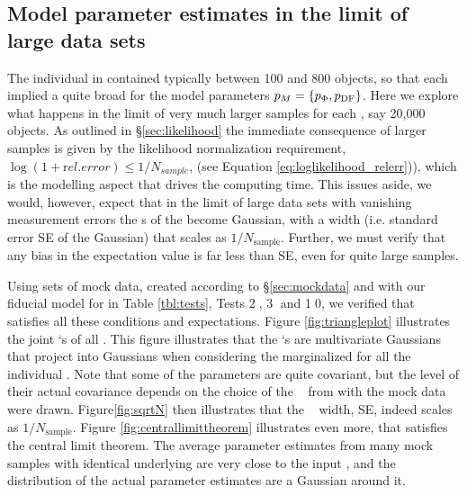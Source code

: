 \subsection{Model parameter estimates in the limit of large data sets} \label{sec:largedata}

The individual \MAP in \citet{bov13} contained typically between 100 and 800 objects, so that each \MAP implied a quite broad \pdf for the model parameters $p_M=\{p_\Phi,p_\text{DF}\}$. Here we explore what happens in the limit of very much larger samples for each \MAP, say 20,000 objects. As outlined in \S\ref{sec:likelihood} the immediate consequence of larger samples is given by the likelihood normalization requirement, $\log(1+{\mathrm rel. error})\le 1/N_{sample}$, (see Equation \ref{eq:loglikelihood_relerr})), which is the modelling aspect that drives the computing time. This issues aside, we would, however, expect that in the limit of large data sets with vanishing measurement errors the \pdf s of the \pmodel become Gaussian, with a \pdf width (i.e. standard error SE of the Gaussian) that scales as $1/N_\text{sample}$. Further, we must verify that any bias in the \pdf expectation value is far less than SE, even for quite large samples.

Using sets of mock data, created according to \S\ref{sec:mockdata} and with our fiducial model for \pmodel in Table \ref{tbl:tests}, Tests \textcircled{2}, \textcircled{3} and \textcircled{10}, we verified that \RM satisfies all these conditions and expectations. Figure \ref{fig:triangleplot} illustrates the joint \pdf `s of all \pmodel. This figure illustrates that the \pdf `s are multivariate Gaussians that project into Gaussians when considering the marginalized \pdf for all the individual \pmodel . Note that some of the parameters are quite covariant, but the level of their actual covariance depends on the choice of the \pmodel~ from with the mock data were drawn.  Figure\ref{fig:sqrtN} then illustrates that the \pdf~ width, SE, indeed scales as $1/N_\text{sample}$. Figure \ref{fig:centrallimittheorem} illustrates even more, that \RM satisfies the central limit theorem. The average parameter estimates from many mock samples with identical underlying \pmodel are very close to the input \pmodel , and the distribution of the actual parameter estimates are a Gaussian around it. 



